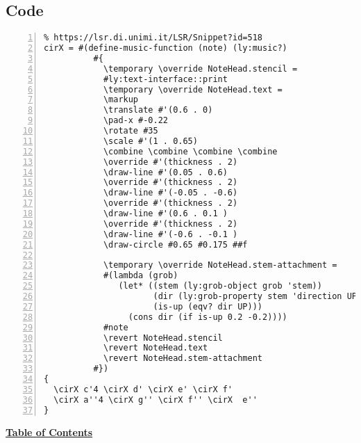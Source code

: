 \subsection{Code}
\begin{Verbatim}[numbers=left,xleftmargin=5mm]
% Stem attachment function inspired by:
% https://lsr.di.unimi.it/LSR/Snippet?id=518
cirX = #(define-music-function (note) (ly:music?)
          #{
            \temporary \override NoteHead.stencil =
            #ly:text-interface::print
            \temporary \override NoteHead.text =
            \markup
            \translate #'(0.6 . 0)
            \pad-x #-0.22
            \rotate #35
            \scale #'(1 . 0.65)
            \combine \combine \combine \combine
            \override #'(thickness . 2)
            \draw-line #'(0.05 . 0.6)
            \override #'(thickness . 2)
            \draw-line #'(-0.05 . -0.6)
            \override #'(thickness . 2)
            \draw-line #'(0.6 . 0.1 )
            \override #'(thickness . 2)
            \draw-line #'(-0.6 . -0.1 )
            \draw-circle #0.65 #0.175 ##f

            \temporary \override NoteHead.stem-attachment =
            #(lambda (grob)
               (let* ((stem (ly:grob-object grob 'stem))
                      (dir (ly:grob-property stem 'direction UP))
                      (is-up (eqv? dir UP)))
                 (cons dir (if is-up 0.2 -0.2))))
            #note
            \revert NoteHead.stencil
            \revert NoteHead.text
            \revert NoteHead.stem-attachment
          #})
{
  \cirX c'4 \cirX d' \cirX e' \cirX f'
  \cirX a''4 \cirX g'' \cirX f'' \cirX  e''
}
\end{Verbatim}
\hyperref[sec:toc]{\textbf{Table of Contents}}

\vfill \break

